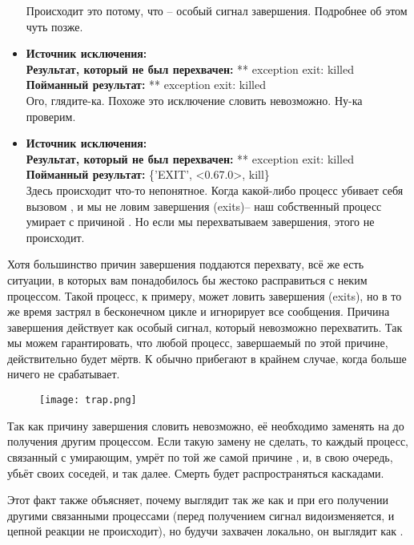 \begin{itemize}
    Происходит это потому, что  \--- особый сигнал завершения.
    Подробнее об этом чуть позже.
\item
    \textbf{Источник исключения:} \\
    \textbf{Результат, который не был перехвачен:} ** exception exit: killed\\
    \textbf{Пойманный результат:} ** exception exit: killed\\
    Ого, глядите\--ка.
    Похоже это исключение словить невозможно.
    Ну\--ка проверим.
\item
    \textbf{Источник исключения:} \\
    \textbf{Результат, который не был перехвачен:} ** exception exit: killed\\
    \textbf{Пойманный результат:} \{'EXIT', <0.67.0>, kill\}\\
    Здесь происходит что\--то непонятное.
    Когда какой\--либо процесс убивает себя вызовом , и мы не ловим  завершения (exits)\--- наш собственный процесс умирает с причиной .
    Но если мы перехватываем завершения, этого не происходит.
\end{itemize}

Хотя большинство причин завершения поддаются перехвату, всё же есть ситуации, в которых вам понадобилось бы жестоко расправиться с неким процессом.
Такой процесс, к примеру, может ловить завершения (exits), но в то же время застрял в бесконечном цикле и игнорирует все сообщения.
Причина завершения  действует как особый сигнал, который невозможно перехватить.
Так мы можем гарантировать, что любой процесс, завершаемый по этой причине, действительно будет мёртв.
К  обычно прибегают в крайнем случае, когда больше ничего не срабатывает.
\begin{wrapfigure}{r}{0.4\linewidth}
    \texttt{[image: trap.png]}
\end{wrapfigure}

Так как причину завершения  словить невозможно, её необходимо заменять на  до получения другим процессом. 
Если такую замену не сделать, то каждый процесс, связанный с умирающим, умрёт по той же самой причине , и, в свою очередь, убьёт своих соседей, и так далее.
Смерть будет распространяться каскадами.

Этот факт также объясняет, почему  выглядит так же как и  при его получении другими связанными процессами (перед получением сигнал видоизменяется, и цепной реакции не происходит), но будучи захвачен локально, он выглядит как .

